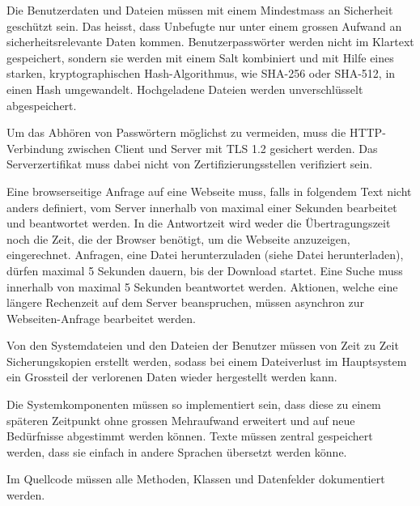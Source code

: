 Die Benutzerdaten und Dateien müssen mit einem Mindestmass an Sicherheit geschützt sein. Das heisst, dass Unbefugte nur unter einem grossen Aufwand an sicherheitsrelevante Daten kommen. Benutzerpasswörter werden nicht im Klartext gespeichert, sondern sie werden mit einem Salt kombiniert und mit Hilfe eines starken, kryptographischen \gls{Hash-Algorithmus}, wie SHA-256 oder SHA-512, in einen Hash umgewandelt. Hochgeladene Dateien werden unverschlüsselt abgespeichert.

Um das Abhören von Passwörtern möglichst zu vermeiden, muss die HTTP-Verbindung zwischen Client und Server mit \gls{TLS} 1.2 gesichert werden. Das Serverzertifikat muss dabei nicht von Zertifizierungsstellen verifiziert sein.

Eine browserseitige Anfrage auf eine Webseite muss, falls in folgendem Text nicht anders definiert, vom Server innerhalb von maximal einer Sekunden bearbeitet und beantwortet werden. In die Antwortzeit wird weder die Übertragungszeit noch die Zeit, die der Browser benötigt, um die Webseite anzuzeigen, eingerechnet. Anfragen, eine Datei herunterzuladen (siehe Datei herunterladen), dürfen maximal 5 Sekunden dauern, bis der Download startet. Eine Suche muss innerhalb von maximal 5 Sekunden beantwortet werden. Aktionen, welche eine längere Rechenzeit auf dem Server beanspruchen, müssen asynchron zur Webseiten-Anfrage bearbeitet werden.

Von den Systemdateien und den Dateien der Benutzer müssen von Zeit zu Zeit Sicherungskopien erstellt werden, sodass bei einem Dateiverlust im Hauptsystem ein Grossteil der verlorenen Daten wieder hergestellt werden kann. 

Die Systemkomponenten müssen so implementiert sein, dass diese zu einem späteren Zeitpunkt ohne grossen Mehraufwand erweitert und auf neue Bedürfnisse abgestimmt werden können. Texte müssen zentral gespeichert werden, dass sie einfach in andere Sprachen übersetzt werden könne.

Im Quellcode müssen alle Methoden, Klassen und Datenfelder dokumentiert werden.